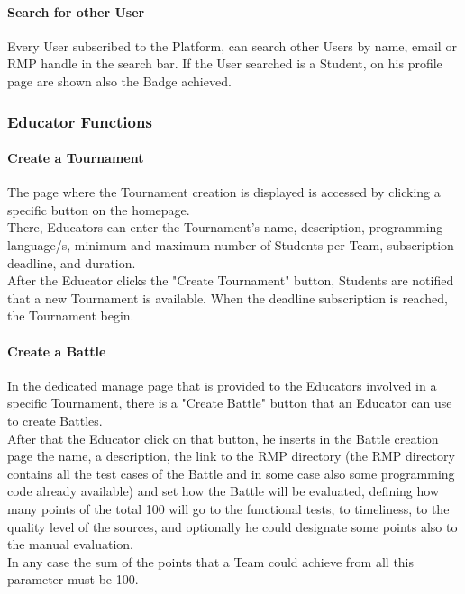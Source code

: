 \paragraph{Search for other User}
Every User subscribed to the Platform, can search other Users by name, email or RMP handle in the search bar. If the User searched is a Student, on his profile page are shown also the Badge achieved.

\subsubsection{Educator Functions}
\paragraph{Create a Tournament}
The page where the Tournament creation is displayed is accessed by clicking a specific button on the homepage.\\
There, Educators can enter the Tournament's name, description, programming language/s, minimum and maximum number of Students per Team, subscription deadline, and duration.\\ 
After the Educator clicks the "Create Tournament" button, Students are notified that a new Tournament is available.
When the deadline subscription is reached, the Tournament begin.
\paragraph{Create a Battle}
In the dedicated manage page that is provided to the Educators involved in a specific Tournament, there is a "Create Battle" button that an Educator can use to create Battles.\\
After that the Educator click on that button, he inserts in the Battle creation page the name, a description, the link to the RMP directory (the RMP directory contains all the test cases of the Battle
and in some case also some programming code already available) and set how the Battle will be evaluated, defining how many points of the total 100 will go to the functional tests, to timeliness, to 
the quality level of the sources, and optionally he could designate some points also to the manual evaluation.\\
In any case the sum of the points that a Team could achieve from all this parameter must be 100.
